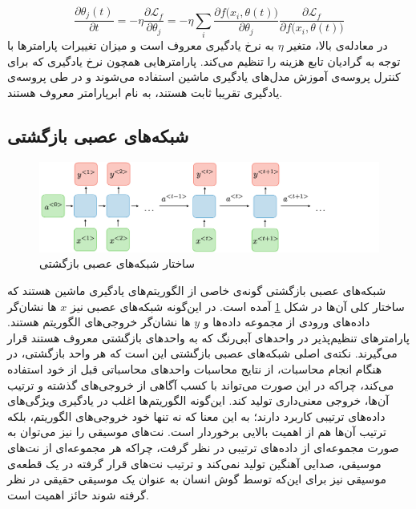 \begin{equation}
    \frac{\partial \theta_j(t)}{\partial t} = - \eta \frac{\partial \mathcal{L}_f}{\partial \theta_j}
    = - \eta \sum_i \frac{\partial f \big(x_i, \theta (t)\big)}{\partial \theta_j} \frac{\partial \mathcal{L}_f}{\partial f \big(x_i, \theta(t)\big)}
\end{equation}
در معادله‌ی بالا، متغیر
$\eta$
به نرخ یادگیری معروف است و میزان تغییرات پارامترها با توجه به گرادیان تابع هزینه را تنظیم می‌کند.
پارامترهایی همچون نرخ یادگیری که برای کنترل پروسه‌ی آموزش مدل‌های یادگیری ماشین استفاده می‌شوند و در طی پروسه‌ی یادگیری تقریبا ثابت هستند، به نام ابرپارامتر معروف هستند.


\subsection{
شبکه‌های عصبی بازگشتی
}

\begin{figure}
	\centering
	\includegraphics[scale=0.35]{figures/architecture-rnn.png}
	\caption [
	ساختار شبکه‌های عصبی بازگشتی
	]{
	ساختار شبکه‌های عصبی بازگشتی 
	\cite{rnncheat}
	}
	\label{fig:rnnarch}
\end{figure}

شبکه‌های عصبی بازگشتی گونه‌ی خاصی از الگوریتم‌های یادگیری ماشین هستند که ساختار کلی آن‌ها در شکل \ref{fig:rnnarch} آمده است.
در این‌گونه شبکه‌های عصبی نیز
$x$
ها نشان‌گر داده‌های ورودی از مجموعه داده‌ها و
$y$
ها نشان‌گر خروجی‌های الگوریتم هستند.
پارامترهای تنظیم‌پذیر در واحد‌های آبی‌رنگ که به 
واحد‌های بازگشتی معروف هستند قرار می‌گیرند.
نکته‌ی اصلی شبکه‌های عصبی بازگشتی این است که هر واحد بازگشتی، در هنگام انجام محاسبات، از نتایج محاسبات واحد‌های محاسباتی قبل از خود استفاده می‌کند، چراکه در این صورت می‌تواند با کسب آگاهی از خروجی‌های گذشته و ترتیب آن‌ها، خروجی معنی‌داری تولید کند.
این‌گونه الگوریتم‌ها اغلب در یادگیری ویژگی‌های داده‌های ترتیبی کاربرد دارند؛ به این معنا که نه تنها خود خروجی‌های الگوریتم، بلکه ترتیب آن‌ها هم از اهمیت بالایی برخوردار است.
نت‌های موسیقی را نیز می‌توان به صورت مجموعه‌ای از داده‌های ترتیبی در نظر گرفت، چراکه هر مجموعه‌ای از نت‌های موسیقی، صدایی آهنگین تولید نمی‌کند و ترتیب نت‌های قرار گرفته در یک قطعه‌ی موسیقی نیز برای این‌که توسط گوش انسان به عنوان یک موسیقی حقیقی در نظر گرفته شوند حائز اهمیت است.

